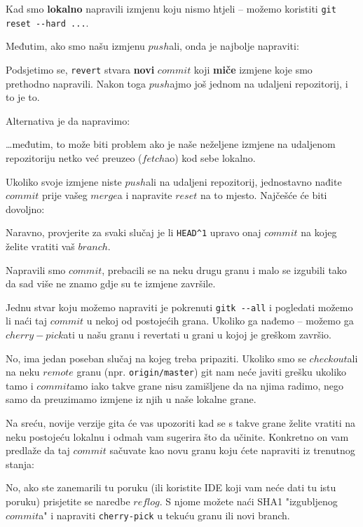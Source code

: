 
Kad smo \textbf{lokalno} napravili izmjenu koju nismo htjeli -- možemo koristiti \verb+git reset --hard ...+.

Međutim, ako smo našu izmjenu $push$ali, onda je najbolje napraviti:


Podsjetimo se, \verb+revert+ stvara \textbf{novi} $commit$ koji \textbf{miče} izmjene koje smo prethodno napravili.
Nakon toga $push$ajmo još jednom na udaljeni repozitorij, i to je to.

Alternativa je da napravimo:


\dots{}međutim, to može biti problem ako je naše neželjene izmjene na udaljenom repozitoriju netko već preuzeo ($fetch$ao) kod sebe lokalno.


Ukoliko svoje izmjene niste $push$ali na udaljeni repozitorij, jednostavno nađite $commit$ prije vašeg $merge$a i napravite $reset$ na to mjesto.
Najčešće će biti dovoljno:


Naravno, provjerite za svaki slučaj je li \verb+HEAD^1+ upravo onaj $commit$ na kojeg želite vratiti vaš $branch$.


Napravili smo $commit$, prebacili se na neku drugu granu i malo se izgubili tako da sad više ne znamo gdje su te izmjene završile.

Jednu stvar koju možemo napraviti je pokrenuti \verb+gitk --all+ i pogledati možemo li naći taj $commit$ u nekoj od postojećih grana.
Ukoliko ga nađemo -- možemo ga $cherry-pick$ati u našu granu i revertati u grani u kojoj je greškom završio.

No, ima jedan poseban slučaj na kojeg treba pripaziti.
Ukoliko smo se $checkout$ali na neku $remote$ granu (npr. \verb+origin/master+) git nam neće javiti grešku ukoliko tamo i $commit$amo iako takve grane nisu zamišljene da na njima radimo, nego samo da preuzimamo izmjene iz njih u naše lokalne grane.

Na sreću, novije verzije gita će vas upozoriti kad se s takve grane želite vratiti na neku postojeću lokalnu i odmah vam sugerira što da učinite.
Konkretno on vam predlaže da taj $commit$ sačuvate kao novu granu koju ćete napraviti iz trenutnog stanja:



No, ako ste zanemarili tu poruku (ili koristite IDE koji vam neće dati tu istu poruku) prisjetite se naredbe $reflog$.
S njome možete naći SHA1 "izgubljenog $commit$a" i napraviti \verb+cherry-pick+ u tekuću granu ili novi branch.
